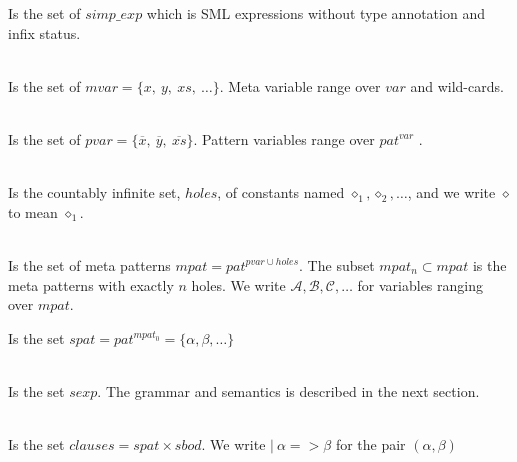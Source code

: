 \begin{definition}
  Is the set of $simp\_exp$ which is SML expressions without type annotation and
  infix status. 
\end{definition}

\begin{definition} \ \\
  Is the set of $mvar = \{x,\ y,\ xs,\ \ldots \}$. Meta variable range
  over $var$ and wild-cards.
\end{definition}

\begin{definition} \ \\
  Is the set of $pvar = \{ \overline{x},\ \overline{y},\
  \overline{xs} \}$. Pattern variables range over $pat^{var}$ .
\end{definition}

\begin{definition}[Holes] \ \\
  Is the countably infinite set, $holes$, of constants named $\diamond_1, \diamond_2,
  \ldots$, and we write $\diamond$ to mean $\diamond_1$.
\end{definition}

\begin{definition} \ \\
  Is the set of meta patterns $mpat = pat^{pvar \cup holes}$. The subset $mpat_n
  \subset mpat$ is the meta patterns with exactly $n$ holes. We write
  $\mathcal{A},\mathcal{B}, \mathcal{C}, \ldots$ for variables ranging over
  $mpat$.
\end{definition}

\begin{definition}
  Is the set $spat = pat^{mpat_0} = \{\alpha, \beta, \ldots \}$
\end{definition}

\begin{definition} \ \\
  Is the set $sexp$. The grammar and semantics is described in the next section.
\end{definition}

\begin{definition} \ \\
  Is the set $clauses = spat \times sbod$. We write $|\ \alpha => \beta$ for the pair
  $(\alpha, \beta)$
\end{definition}

